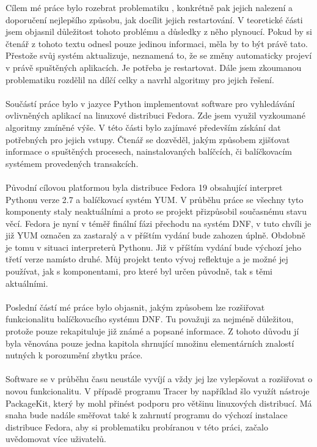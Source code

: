 \documentclass[
  field=inf,
  biblatex,
  glossaries,
  index
]{kidiplom}
\begin{document}
\begin{kiconclusions}
	Cílem mé práce bylo rozebrat problematiku , konkrétně pak jejich nalezení a doporučení nejlepšího způsobu, jak docílit jejich restartování. V teoretické části jsem objasnil důležitost tohoto problému a důsledky z něho plynoucí. Pokud by si čtenář z tohoto textu odnesl pouze jedinou informaci, měla by to být právě tato. Přestože svůj systém aktualizuje, neznamená to, že se změny automaticky projeví v právě spuštěných aplikacích. Je potřeba je restartovat. Dále jsem zkoumanou problematiku rozdělil na dílčí celky a navrhl algoritmy pro jejich řešení.
	\\
	\\
	Součástí práce bylo v jazyce Python implementovat software pro vyhledávání ovlivněných aplikací na linuxové distribuci Fedora. Zde jsem využil vyzkoumané algoritmy zmíněné výše. V této části bylo zajímavé především získání dat potřebných pro jejich vstupy. Čtenář se dozvěděl, jakým způsobem zjišťovat informace o spuštěných procesech, nainstalovaných balíčcích, či balíčkovacím systémem provedených transakcích.
	\\
	\\
	Původní cílovou platformou byla distribuce Fedora 19 obsahující interpret Pythonu verze 2.7 a balíčkovací systém YUM. V průběhu práce se všechny tyto komponenty staly neaktuálními a proto se projekt přizpůsobil současnému stavu věcí. Fedora je nyní v téměř finální fázi přechodu na systém DNF, v tuto chvíli je již YUM označen za zastaralý a v příštím vydání bude zahozen úplně. Obdobně je tomu v situaci interpreterů Pythonu. Již v příštím vydání bude výchozí jeho třetí verze namísto druhé. Můj projekt tento vývoj reflektuje a je možné jej používat, jak s komponentami, pro které byl určen původně, tak s těmi aktuálními.
	\\
	\\
	Poslední částí mé práce bylo objasnit, jakým způsobem lze rozšiřovat funkcionalitu balíčkovacího systému DNF. Tu považuji za nejméně důležitou, protože pouze rekapituluje již známé a popsané informace. Z tohoto důvodu jí byla věnována pouze jedna kapitola shrnující množinu elementárních znalostí nutných k porozumění zbytku práce.
	\\
	\\
	Software se v průběhu času neustále vyvíjí a vždy jej lze vylepšovat a rozšiřovat o novou funkcionalitu. V případě programu Tracer by například šlo využít nástroje PackageKit, který by mohl přinést podporu pro většinu linuxových distribucí. Má snaha bude nadále směřovat také k zahrnutí programu do výchozí instalace distribuce Fedora, aby si problematiku probíranou v této práci, začalo uvědomovat více uživatelů.
\end{kiconclusions}
\end{document}
